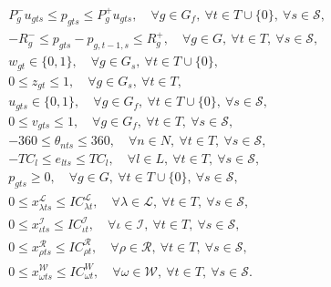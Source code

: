\begin{subequations}
\begin{align}
	&P_g^- u_{gts} \le p_{gts} \le P_g^+ u_{gts},\quad\forall g\in G_f,\ \forall t\in T\cup\{0\},\ \forall s\in\mathcal{S},\label{sucw:k}\\
	&-R_g^- \le p_{gts}-p_{g,t-1,s} \le R_g^+ ,\quad\forall g\in G,\ \forall t\in T,\ \forall s\in\mathcal{S},\label{sucw:l}\\
	&w_{gt}\in\{0,1\},\quad\forall g\in G_s,\ \forall t\in T\cup\{0\},\label{sucw:m}\\
	& 0\le z_{gt}\le 1,\quad\forall g\in G_s,\ \forall t\in T,\label{sucw:n}\\
	&u_{gts}\in\{0,1\},\quad\forall g\in G_f,\ \forall t\in T\cup\{0\},\ \forall s\in\mathcal{S},\label{sucw:o}\\
	&0\le v_{gts}\le 1,\quad\forall g\in G_f,\ \forall t\in T,\ \forall s\in\mathcal{S},\label{sucw:p}\\
	&-360\le\theta_{nts}\le 360,\quad\forall n\in N,\ \forall t\in T,\ \forall s\in\mathcal{S},\label{sucw:q}\\
	&-TC_l\le e_{lts}\le TC_l,\quad\forall l\in L,\ \forall t\in T,\ \forall s\in\mathcal{S},\label{sucw:r}\\
	&p_{gts}\ge 0,\quad\forall g\in G,\ \forall t\in T\cup\{0\},\ \forall s\in\mathcal{S},\label{sucw:s}\\
	&0\le x_{\lambda ts}^\mathcal{L}\le IC_{\lambda t}^\mathcal{L},\quad\forall \lambda\in \mathcal{L},\ \forall t\in T,\ \forall s\in\mathcal{S},\label{sucw:t}\\
	&0\le x_{\iota ts}^\mathcal{I}\le IC_{\iota t}^\mathcal{I},\quad\forall \iota \in \mathcal{I},\ \forall t\in T,\ \forall s\in\mathcal{S},\label{sucw:u}\\
	&0\le x_{\rho ts}^\mathcal{R} \le IC_{\rho t}^\mathcal{R},\quad\forall \rho\in\mathcal{R},\ \forall t\in T,\ \forall s\in\mathcal{S},\label{sucw:v}\\
	&0\le x_{\omega ts}^\mathcal{W}\le IC_{\omega t}^W,\quad\forall \omega\in\mathcal{W},\ \forall t\in T,\ \forall s\in\mathcal{S}.\label{sucw:w}
	\end{align}	
\end{subequations}

